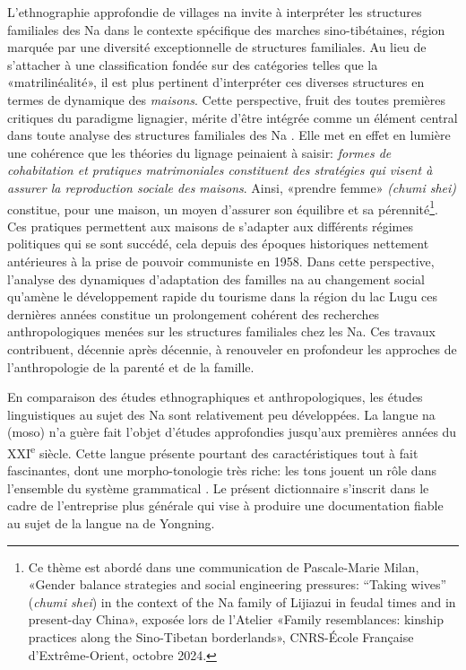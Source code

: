 L'ethnographie approfondie de villages na \parencite{milan_na_2016,milan_tourisme_2019} invite à interpréter les structures familiales des Na dans le contexte spécifique des marches sino-tibétaines, région marquée par une diversité exceptionnelle de structures familiales.
Au lieu de s’attacher à une classification fondée sur des catégories telles que la «matrilinéalité», il est plus pertinent d’interpréter ces diverses structures en termes de dynamique des \emph{maisons}. Cette perspective, fruit des toutes premières critiques du paradigme lignagier, mérite d'être intégrée comme un élément central dans toute analyse des structures familiales des Na \parencite{zhou_zigong_2003,hosana_2006}. Elle met en effet en lumière une cohérence que les théories du lignage peinaient à saisir: \emph{formes de cohabitation et pratiques matrimoniales constituent des stratégies qui visent à assurer la reproduction sociale des maisons}. Ainsi, «prendre femme» \emph{(chumi shei)} constitue, pour une maison, un moyen d’assurer son équilibre et sa pérennité\footnote{Ce thème est abordé dans une communication de Pascale-Marie Milan, «Gender balance strategies and social engineering pressures: “Taking wives” (\emph{chumi shei}) in the context of the Na family of Lijiazui in feudal times and in present-day China», exposée lors de l'Atelier «Family resemblances: kinship practices along the Sino-Tibetan borderlands», CNRS-École Française d'Extrême-Orient, octobre 2024.}. Ces pratiques permettent aux maisons de s'adapter aux différents régimes politiques qui se sont succédé, cela depuis des époques historiques nettement antérieures à la prise de pouvoir communiste en 1958. Dans cette perspective, l'analyse des dynamiques d'adaptation des familles na au changement social qu'amène le développement rapide du tourisme dans la région du lac Lugu ces dernières années \parencite{walsh_living_2001,mattison2010,milan_tourisme_2019} constitue un prolongement cohérent des recherches anthropologiques menées sur les structures familiales chez les Na. Ces travaux contribuent, décennie après décennie, à renouveler en profondeur les approches de l'anthropologie de la parenté et de la famille.

En comparaison des études ethnographiques et anthropologiques, les études linguistiques au sujet des Na sont relativement peu développées. La langue na (moso) n'a guère fait l'objet d'études approfondies jusqu'aux premières années du XXI\textsuperscript{e} siècle. Cette langue présente pourtant des caractéristiques tout à fait fascinantes, dont une morpho-tonologie très riche: les tons jouent un rôle dans l'ensemble du système grammatical \parencite{michaud2017}. Le présent dictionnaire s'inscrit dans le cadre de l'entreprise plus générale qui vise à produire une documentation fiable au sujet de la langue na de Yongning.

